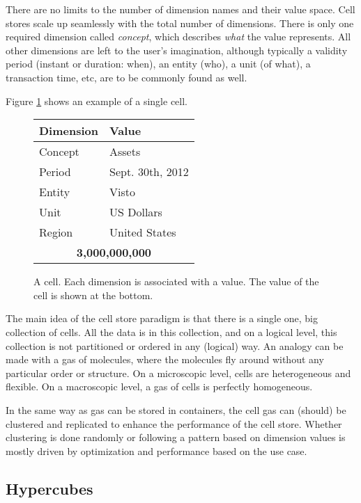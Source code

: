 \documentclass{acm_proc_article-sp}
\begin{document}
There are no limits to the number of dimension names and their value space. Cell stores scale up seamlessly with the total number of dimensions. There is only one required dimension called \emph{concept}, which describes \emph{what} the value represents. All other dimensions are left to the user's imagination, although typically a validity period (instant or duration: when), an entity (who), a unit (of what), a transaction time, etc, are to be commonly found as well.

Figure \ref{fig-cell} shows an example of a single cell.

\begin{figure}
\centering
\vspace{3mm}
\begin{tabular}{ll}
\hline
\hline
Dimension & Value \\
\hline
Concept & Assets \\
Period & Sept. 30th, 2012 \\
Entity & Visto \\
Unit & US Dollars \\
Region & United States \\
\hline
\multicolumn{2}{c}{\textbf{3,000,000,000}} \\
\hline
\end{tabular}
\vspace{5pt}
\caption{A cell. Each dimension is associated with a value. The value of the cell is shown at the bottom.}
\label{fig-cell}
\end{figure}

The main idea of the cell store paradigm is that there is a single one, big collection of cells. All the data is in this collection, and on a logical level, this collection is not partitioned or ordered in any (logical) way. An analogy can be made with a gas of molecules, where the molecules fly around without any particular order or structure. On a microscopic level, cells are heterogeneous and flexible. On a macroscopic level, a gas of cells is perfectly homogeneous.

In the same way as gas can be stored in containers, the cell gas can (should) be clustered and replicated to enhance the performance of the cell store. Whether clustering is done randomly or following a pattern based on dimension values is mostly driven by optimization and performance based on the use case.

\subsection{Hypercubes}
\end{document}
